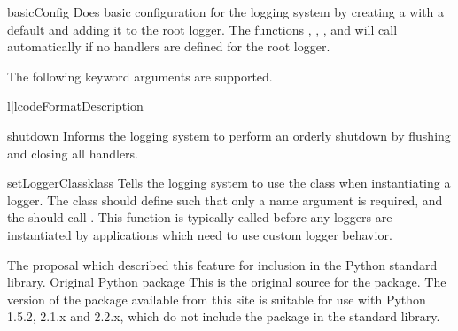 \begin{funcdesc}{basicConfig}{}
Does basic configuration for the logging system by creating a
 with a default  and adding it to
the root logger. The functions , ,
,  and  will call
 automatically if no handlers are defined for the
root logger.


The following keyword arguments are supported.

\begin{tableii}{l|l}{code}{Format}{Description}
\end{tableii}

\end{funcdesc}

\begin{funcdesc}{shutdown}{}
Informs the logging system to perform an orderly shutdown by flushing and
closing all handlers.
\end{funcdesc}

\begin{funcdesc}{setLoggerClass}{klass}
Tells the logging system to use the class  when instantiating a
logger. The class should define  such that only a name
argument is required, and the  should call
. This function is typically called before any
loggers are instantiated by applications which need to use custom logger
behavior.
\end{funcdesc}


\begin{seealso}
         {The proposal which described this feature for inclusion in
          the Python standard library.}
          {Original Python  package}
          {This is the original source for the 
           package.  The version of the package available from this
           site is suitable for use with Python 1.5.2, 2.1.x and 2.2.x,
           which do not include the  package in the standard
           library.}
\end{seealso}



